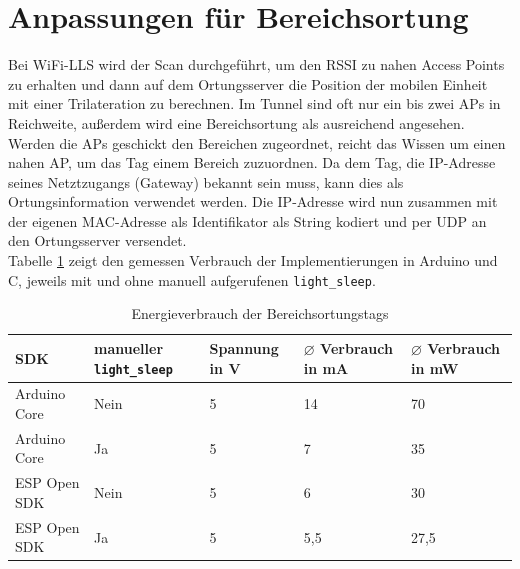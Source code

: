 \section{Anpassungen für Bereichsortung}
\label{ch:phase1:sec:anpassungbereich}
Bei WiFi-LLS wird der Scan durchgeführt, um den RSSI zu nahen Access Points zu erhalten und dann auf dem Ortungsserver die Position der mobilen Einheit mit einer Trilateration zu berechnen.
Im Tunnel sind oft nur ein bis zwei APs in Reichweite, außerdem wird eine Bereichsortung als ausreichend angesehen. \\
Werden die APs geschickt den Bereichen zugeordnet, reicht das Wissen um einen nahen AP, um das Tag einem Bereich zuzuordnen.
Da dem Tag, die IP-Adresse seines Netztzugangs (Gateway) bekannt sein muss, kann dies als Ortungsinformation verwendet werden.
Die IP-Adresse wird nun zusammen mit der eigenen MAC-Adresse als Identifikator als String kodiert und per UDP an den Ortungsserver versendet.\\
Tabelle \ref{table:naiveconsumption} zeigt den gemessen Verbrauch der Implementierungen in Arduino und C, jeweils mit und ohne manuell aufgerufenen \texttt{light\_sleep}.

\begin{table}[h]
	\centering
	\caption{Energieverbrauch der Bereichsortungstags}
	\label{table:naiveconsumption}
	\begin{tabular}{p{3cm}|p{2.2cm}|p{1.7cm}|p{2.5cm}|p{2.5cm}}
		SDK & manueller \texttt{light\_sleep} & Spannung in V & $\varnothing$ Verbrauch in mA & $\varnothing$ Verbrauch in mW \\
		\hline
		Arduino Core & Nein & 5 & 14 & 70 \\
		Arduino Core & Ja & 5 & 7 & 35 \\
		ESP Open SDK & Nein & 5 & 6 & 30 \\
		ESP Open SDK & Ja & 5 & 5,5 & 27,5 \\
	\end{tabular}
\end{table}

